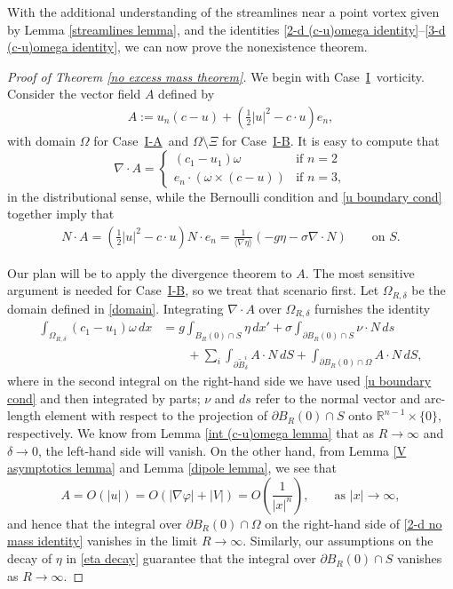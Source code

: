 \documentclass[11pt,reqno]{amsart}
\newcommand{\I}{\texorpdfstring{\hyperref[sec non-singular]{I}}{I}}
\newcommand{\NS}{\texorpdfstring{\hyperref[sec non-singular]{I-A}}{I-A}}
\newcommand{\PV}{\texorpdfstring{\hyperref[sec point]{I-B}}{I-B}}
\newcommand{\jbracket}[1]{\langle{#1}\rangle}
\theoremstyle{plain}
\theoremstyle{remark}
\numberwithin{equation}{section}
\begin{document}
 With the additional understanding of the streamlines near a point vortex given by Lemma \ref{streamlines lemma}, and the identities \eqref{2-d (c-u)omega identity}--\eqref{3-d (c-u)omega identity}, we can now prove the nonexistence theorem.  
 
 \begin{proof}[Proof of Theorem \ref{no excess mass theorem}]
   We begin with Case~\I\ vorticity.  Consider the vector field  $A$ defined by 
  \begin{align*}
    A := u_n(c-u) + \left( \frac{1}{2} |u|^2  - c \cdot u \right) e_n,
  \end{align*} 
  with domain $\Omega$ for Case~\NS\ and $\Omega \setminus \Xi$ for Case~\PV.
  It is easy to compute that 
  \[ \nabla \cdot A = \left\{ \begin{array}{ll} (c_1 - u_1) \omega & \textrm{if } n = 2 \\
  e_n \cdot \left(\omega \times (c-u) \right) & \textrm{if } n =3, \end{array} \right.\]
in the distributional sense, while the Bernoulli condition and \eqref{u boundary cond} together imply that
  \begin{align*}
    N \cdot  A 
    = \left( \frac{1}{2} |u|^2 - c \cdot u \right) N \cdot e_n 
    = \frac{1}{\jbracket{\nabla \eta}} (-g \eta - \sigma \nabla \cdot N) \qquad \textrm{on } S.
  \end{align*}

Our plan will be to apply the divergence theorem to $A$.  The most sensitive argument is needed for Case~\PV, so we treat that scenario first.  Let $\Omega_{R, \delta}$ be the domain defined in \eqref{domain}.  Integrating $\nabla \cdot A$ over $\Omega_{R,\delta}$ furnishes the identity
 \begin{equation}
   \begin{split}
     \int_{\Omega_{R,\delta}} \left( c_1 - u_1 \right) \omega \, dx & = g\int_{B_R(0) \cap S} \eta \, dx' + \sigma \int_{\partial B_R(0) \cap S} \nu \cdot N \, ds \\  & \qquad + \sum_i \int_{\partial \tilde B^i_\delta}  A \cdot N \, dS + \int_{\partial B_R(0) \cap \Omega}  A \cdot N \, dS,
   \end{split} \label{2-d no mass identity} 
\end{equation}
where in the second integral on the right-hand side we have used \eqref{u boundary cond} and then integrated by parts; $\nu$ and $ds$ refer to the normal vector and arc-length element with respect to the projection of $\partial B_R(0) \cap S$ onto $\mathbb R^{n-1} \times \{0\}$, respectively.  We know from Lemma \ref{int (c-u)omega lemma} that as $R \to \infty$ and $\delta \to 0$, the left-hand side will vanish.  On the other hand, from Lemma \ref{V asymptotics lemma} and Lemma \ref{dipole lemma}, we see that 
  \[ A = O(|u|) = O\left(|\nabla \varphi| + |V|\right) =  O\left(\frac{1}{|x|^n}\right), \qquad \textrm{as } |x| \to \infty,\]
  and hence that the  integral over $\partial B_R(0) \cap \Omega$ on the right-hand side of \eqref{2-d no mass identity} vanishes in the limit $R \to \infty$. Similarly, our assumptions on the decay of $\eta$ in \eqref{eta decay} guarantee that the integral over $\partial B_R(0) \cap S$ vanishes as $R \to \infty$. 


\end{proof}
\end{document}

